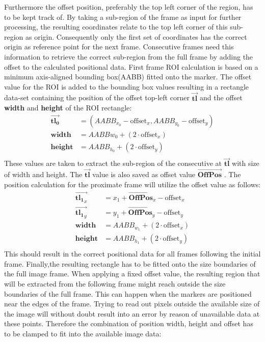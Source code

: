 Furthermore the offset position, preferably the top left corner of the region, has to be kept track of. By taking a sub-region of the frame as input for further processing, the resulting coordinates relate to the top left corner of this sub-region as origin. Consequently only the first set of coordinates has the correct origin as reference point for the next frame. Consecutive frames need this information to retrieve the correct sub-region from the full frame by adding the offset to the calculated positional data.
First frame ROI calculation is based on a minimum axis-aligned bounding box(AABB) fitted onto the marker. The offset value for the ROI is added to the bounding box values resulting in a rectangle data-set containing the position of the offset top-left corner $\vec{\mathbf{tl}}$ and the offset 
\textbf{width} and \textbf{height} of the ROI rectangle:
\begin{equation}
\begin{split}
\vec{\mathbf{tl_{0}}}&=(AABB_{x_{0}}-\text{offset}_{x},AABB_{y_{0}}-\text{offset}_{y})\\
\mathbf{width}&=AABB{w_{0}}+(2\cdot\text{offset}_{x})\\
\mathbf{height}&=AABB_{h_{0}}+(2\cdot\text{offset}_{y})\\
\end{split}
\end{equation}
These values are taken to extract the sub-region of the consecutive at $\vec{\mathbf{tl}}$ with size of width and height. The $\vec{\mathbf{tl}}$ value is also saved as offset value $\vec{\mathbf{OffPos}}$ .
The position calculation for the proximate frame will utilize the offset value as follows:
\begin{equation}
\begin{split}
\vec{\mathbf{tl_{1}}_{x}}&=x_{1}+\vec{\mathbf{OffPos}}_{x}-\text{offset}_{x} \\ \vec{\mathbf{tl_{1}}_{y}}&=y_{1}+\vec{\mathbf{OffPos}}_{y}-\text{offset}_{y}\\
\mathbf{width}&=AABB_{w_{1}}+(2\cdot\text{offset}_{x})\\
\mathbf{height}&=AABB_{h_{1}}+(2\cdot\text{offset}_{y})\\
\end{split}
\end{equation}
This should result in the correct positional data for all frames following the initial frame.
Finally,the resulting rectangle has to be fitted onto the size boundaries of the full image frame. When applying a fixed offset value, the resulting region that will be extracted from the following frame might reach outside the size boundaries of the full frame. This can happen when the markers are positioned near the edges of the frame. Trying to read out pixels outside the available size of the image will without doubt result into an error by reason of unavailable data at these points. Therefore the combination of position width, height and offset has to be clamped to fit into the available image data:
